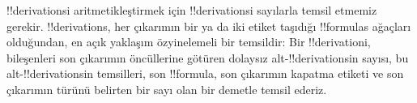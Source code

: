 


\begin{explain}
!!{derivation}s{}i aritmetikleştirmek için !!{derivation}s{}i sayılarla temsil
etmemiz gerekir. !!{derivation}s, her çıkarımın bir ya da iki etiket taşıdığı
!!{formula}s ağaçları olduğundan, en açık yaklaşım özyinelemeli bir temsildir:
Bir !!{derivation}{}i, bileşenleri son çıkarımın öncüllerine götüren dolaysız
alt-!!{derivation}s{}in sayısı, bu alt-!!{derivation}s{}in temsilleri, son
!!{formula}, son çıkarımın kapatma etiketi ve son çıkarımın türünü belirten
bir sayı olan bir demetle temsil ederiz.
\end{explain}

